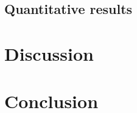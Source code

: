 \documentclass[10pt]{article}
\begin{document}
\subsection{Quantitative results}



\section{Discussion}
\label{sec:dis}



\section{Conclusion}
\label{sec:conc}



\vskip 0.2in

\end{document}

